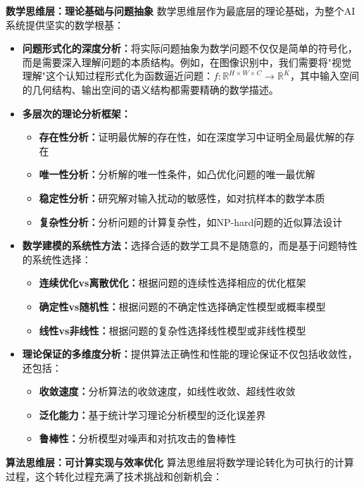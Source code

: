 \textbf{数学思维层：理论基础与问题抽象}
数学思维层作为最底层的理论基础，为整个AI系统提供坚实的数学根基：

\begin{itemize}
\item \textbf{问题形式化的深度分析：}将实际问题抽象为数学问题不仅仅是简单的符号化，而是需要深入理解问题的本质结构。例如，在图像识别中，我们需要将"视觉理解"这个认知过程形式化为函数逼近问题：$f: \mathbb{R}^{H \times W \times C} \rightarrow \mathbb{R}^K$，其中输入空间的几何结构、输出空间的语义结构都需要精确的数学描述。

\item \textbf{多层次的理论分析框架：}
\begin{itemize}
\item \textbf{存在性分析：}证明最优解的存在性，如在深度学习中证明全局最优解的存在
\item \textbf{唯一性分析：}分析解的唯一性条件，如凸优化问题的唯一最优解
\item \textbf{稳定性分析：}研究解对输入扰动的敏感性，如对抗样本的数学本质
\item \textbf{复杂性分析：}分析问题的计算复杂性，如NP-hard问题的近似算法设计
\end{itemize}

\item \textbf{数学建模的系统性方法：}选择合适的数学工具不是随意的，而是基于问题特性的系统性选择：
\begin{itemize}
\item \textbf{连续优化vs离散优化：}根据问题的连续性选择相应的优化框架
\item \textbf{确定性vs随机性：}根据问题的不确定性选择确定性模型或概率模型
\item \textbf{线性vs非线性：}根据问题的复杂性选择线性模型或非线性模型
\end{itemize}

\item \textbf{理论保证的多维度分析：}提供算法正确性和性能的理论保证不仅包括收敛性，还包括：
\begin{itemize}
\item \textbf{收敛速度：}分析算法的收敛速度，如线性收敛、超线性收敛
\item \textbf{泛化能力：}基于统计学习理论分析模型的泛化误差界
\item \textbf{鲁棒性：}分析模型对噪声和对抗攻击的鲁棒性
\end{itemize}
\end{itemize}

\textbf{算法思维层：可计算实现与效率优化}
算法思维层将数学理论转化为可执行的计算过程，这个转化过程充满了技术挑战和创新机会：

